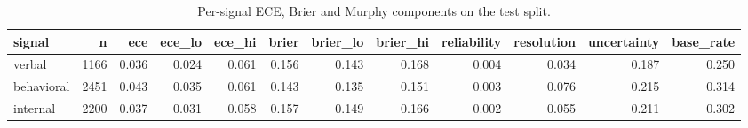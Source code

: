 \begin{table}
\caption{Per-signal ECE, Brier and Murphy components on the test split.}
\label{tab:t6_h1_murphy_decomposition}
\begin{tabular}{lrrrrrrrrrrr}
\toprule
signal & n & ece & ece\_lo & ece\_hi & brier & brier\_lo & brier\_hi & reliability & resolution & uncertainty & base\_rate \\
\midrule
verbal & 1166 & 0.036 & 0.024 & 0.061 & 0.156 & 0.143 & 0.168 & 0.004 & 0.034 & 0.187 & 0.250 \\
behavioral & 2451 & 0.043 & 0.035 & 0.061 & 0.143 & 0.135 & 0.151 & 0.003 & 0.076 & 0.215 & 0.314 \\
internal & 2200 & 0.037 & 0.031 & 0.058 & 0.157 & 0.149 & 0.166 & 0.002 & 0.055 & 0.211 & 0.302 \\
\bottomrule
\end{tabular}
\end{table}
